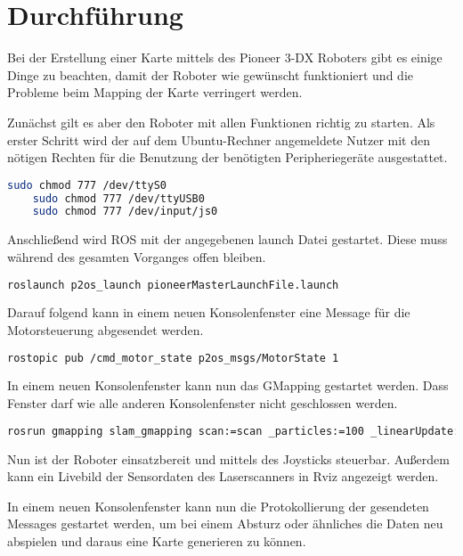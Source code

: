 \chapter{Durchführung} %
\label{cha:durchfuehrung}

Bei der Erstellung einer Karte mittels des Pioneer 3-DX Roboters gibt es einige Dinge zu beachten, damit der Roboter wie gewünscht funktioniert und die Probleme beim Mapping der Karte verringert werden.\par
Zunächst gilt es aber den Roboter mit allen Funktionen richtig zu starten.
Als erster Schritt wird der auf dem Ubuntu-Rechner angemeldete Nutzer mit den nötigen Rechten für die Benutzung der benötigten Pe­ri­phe­rie­ge­räte ausgestattet.

\begin{lstlisting}[language=sh,caption=Rechteverteilung]
    sudo chmod 777 /dev/ttyS0
    sudo chmod 777 /dev/ttyUSB0
    sudo chmod 777 /dev/input/js0
\end{lstlisting}

Anschließend wird  \ac{ROS} mit der angegebenen launch Datei gestartet. Diese muss während des gesamten Vorganges offen bleiben.

\begin{lstlisting}[language=sh,caption=Starten von \ac{ROS}]
    roslaunch p2os_launch pioneerMasterLaunchFile.launch
\end{lstlisting}

Darauf folgend kann in einem neuen Konsolenfenster eine Message für die Motorsteuerung abgesendet werden.

\begin{lstlisting}[language=sh,caption=Starten des Motors]
    rostopic pub /cmd_motor_state p2os_msgs/MotorState 1
\end{lstlisting}

In einem neuen Konsolenfenster kann nun das GMapping gestartet werden. Dass Fenster darf wie alle anderen Konsolenfenster nicht geschlossen werden.

\begin{lstlisting}[language=sh,caption=Starten von GMapping]
    rosrun gmapping slam_gmapping scan:=scan _particles:=100 _linearUpdate:=0.1 _angularUpdate:=0.03
\end{lstlisting}

Nun ist der Roboter einsatzbereit und mittels des Joysticks steuerbar. Außerdem kann ein Livebild der Sensordaten des Laserscanners in Rviz angezeigt werden. 

In einem neuen Konsolenfenster kann nun die Protokollierung der gesendeten Messages gestartet werden, um bei einem Absturz oder ähnliches die Daten neu abspielen und daraus eine Karte generieren zu können.

